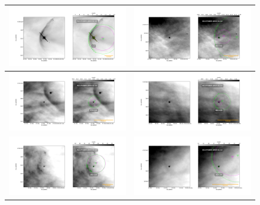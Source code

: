 \begin{figure}[htp]
\centering
\small\raggedright
\renewcommand{\arraystretch}{1.5}
\begin{tabular}{|l|l|}
\hline
   \includegraphics[width=0.47\linewidth,  trim=60 50 100 50, clip]{j8oc01010_wcs/LL1-Bally_01-images.pdf} 
   &\includegraphics[width=0.47\linewidth,  trim=60 50 100 50, clip]{j8oc01010_wcs/065-502-Bally_01-images.pdf}\\ \hline
   \includegraphics[width=0.47\linewidth,  trim=60 50 100 50, clip]{j8oc01010_wcs/074-229-Bally_01-images.pdf}
   &\includegraphics[width=0.47\linewidth,  trim=60 50 100 50, clip]{j8oc01010_wcs/083-435-Bally_01-images.pdf}\\ \hline
   \includegraphics[width=0.47\linewidth,  trim=60 50 100 50, clip]{j8oc01010_wcs/101-233-Bally_01-images.pdf}
   &\includegraphics[width=0.47\linewidth,  trim=60 50 100 50, clip]{j8oc01010_wcs/102-157-Bally_01-images.pdf}\\ \hline

\end{tabular}
\end{figure}
